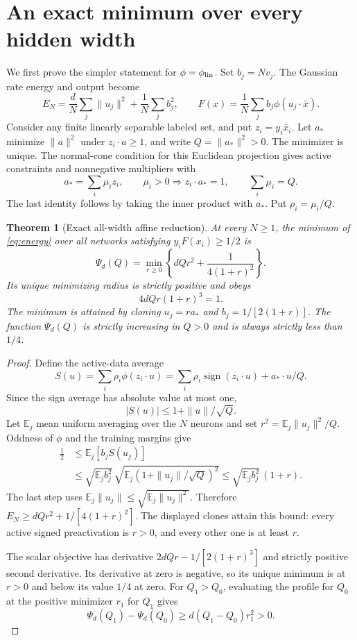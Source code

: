 \documentclass[11pt]{article}
\newtheorem{theorem}{Theorem}
\newcommand{\E}{\mathbb E}
\newcommand{\sgn}{\operatorname{sign}}
\begin{document}
\section{An exact minimum over every hidden width}

We first prove the simpler statement for $\phi=\phi_{\rm lin}$.
Set $b_j=Nv_j$. The Gaussian rate energy and output become
\begin{equation}\label{eq:energy}
 E_N=\frac dN\sum_j\|u_j\|^2+\frac1N\sum_jb_j^2,
 \qquad F(x)=\frac1N\sum_jb_j\phi(u_j\cdot\bar x).
\end{equation}
Consider any finite linearly separable labeled set, and put
$z_i=y_i\bar x_i$. Let $a_*$ minimize $\|a\|^2$ under
$z_i\cdot a\ge1$, and write $Q=\|a_*\|^2>0$.
The minimizer is unique. The normal-cone condition for this Euclidean
projection gives active constraints and nonnegative multipliers with
\[
 a_*=\sum_i\mu_i z_i,\qquad
 \mu_i>0\Longrightarrow z_i\cdot a_*=1,\qquad
 \sum_i\mu_i=Q.
\]
The last identity follows by taking the inner product with $a_*$.
Put $\rho_i=\mu_i/Q$.

\begin{theorem}[Exact all-width affine reduction]\label{thm:energy}
At every $N\ge1$, the minimum of \eqref{eq:energy} over all networks
satisfying $y_iF(x_i)\ge1/2$ is
\begin{equation}\label{eq:profile}
 \Psi_d(Q)=\min_{r\ge0}\left\{dQr^2+\frac1{4(1+r)^2}\right\}.
\end{equation}
Its unique minimizing radius is strictly positive and obeys
\[
 4dQr(1+r)^3=1.
\]
The minimum is attained by cloning
$u_j=r a_*$ and $b_j=1/[2(1+r)]$.
The function $\Psi_d(Q)$ is strictly increasing in $Q>0$ and is always
strictly less than $1/4$.
\end{theorem}
\begin{proof}
Define the active-data average
\[
 S(u)=\sum_i\rho_i\phi(z_i\cdot u)
     =\sum_i\rho_i\sgn(z_i\cdot u)+a_*\cdot u/Q.
\]
Since the sign average has absolute value at most one,
\[
 |S(u)|\le1+\|u\|/\sqrt Q.
\]
Let $\E_j$ mean uniform averaging over the $N$ neurons and set
$r^2=\E_j\|u_j\|^2/Q$. Oddness of $\phi$ and the training margins give
\begin{align*}
 \frac12
 &\le\E_j[b_jS(u_j)]\\
 &\le\sqrt{\E_jb_j^2}\,
       \sqrt{\E_j(1+\|u_j\|/\sqrt Q)^2}
 \le\sqrt{\E_jb_j^2}\,(1+r).
\end{align*}
The last step uses $\E_j\|u_j\|\le\sqrt{\E_j\|u_j\|^2}$.
Therefore $E_N\ge dQr^2+1/[4(1+r)^2]$.
The displayed clones attain this bound: every active signed
preactivation is $r>0$, and every other one is at least $r$.

The scalar objective has derivative $2dQr-1/[2(1+r)^3]$ and strictly
positive second derivative. Its derivative at zero is negative, so its
unique minimum is at $r>0$ and below its value $1/4$ at zero.
For $Q_1>Q_0$, evaluating the profile for $Q_0$ at the positive minimizer
$r_1$ for $Q_1$ gives
\[
 \Psi_d(Q_1)-\Psi_d(Q_0)\ge d(Q_1-Q_0)r_1^2>0.
\]
\end{proof}
\end{document}
